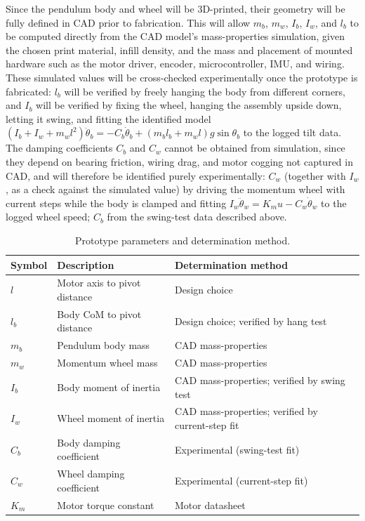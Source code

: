 Since the pendulum body and wheel will be 3D-printed, their geometry will be fully defined in CAD prior to fabrication. This will allow $m_b$, $m_w$, $I_b$, $I_w$, and $l_b$ to be computed directly from the CAD model's mass-properties simulation, given the chosen print material, infill density, and the mass and placement of mounted hardware such as the motor driver, encoder, microcontroller, IMU, and wiring. These simulated values will be cross-checked experimentally once the prototype is fabricated: $l_b$ will be verified by freely hanging the body from different corners, and $I_b$ will be verified by fixing the wheel, hanging the assembly upside down, letting it swing, and fitting the identified model $(I_b+I_w+m_wl^2)\ddot\theta_b = -C_b\dot\theta_b + (m_bl_b+m_wl)g\sin\theta_b$ to the logged tilt data. The damping coefficients $C_b$ and $C_w$ cannot be obtained from simulation, since they depend on bearing friction, wiring drag, and motor cogging not captured in CAD, and will therefore be identified purely experimentally: $C_w$ (together with $I_w$, as a check against the simulated value) by driving the momentum wheel with current steps while the body is clamped and fitting $I_w\ddot\theta_w = K_mu - C_w\dot\theta_w$ to the logged wheel speed; $C_b$ from the swing-test data described above.

\begin{table}[h]
\centering
\caption{Prototype parameters and determination method.}
\label{tab:params}
\begin{tabular}{lll}
\toprule
Symbol & Description & Determination method \\
\midrule
$l$   & Motor axis to pivot distance & Design choice \\
$l_b$ & Body CoM to pivot distance   & Design choice; verified by hang test \\
$m_b$ & Pendulum body mass           & CAD mass-properties \\
$m_w$ & Momentum wheel mass          & CAD mass-properties \\
$I_b$ & Body moment of inertia       & CAD mass-properties; verified by swing test \\
$I_w$ & Wheel moment of inertia      & CAD mass-properties; verified by current-step fit \\
$C_b$ & Body damping coefficient     & Experimental (swing-test fit) \\
$C_w$ & Wheel damping coefficient    & Experimental (current-step fit) \\
$K_m$ & Motor torque constant        & Motor datasheet \\
\bottomrule
\end{tabular}
\end{table}

